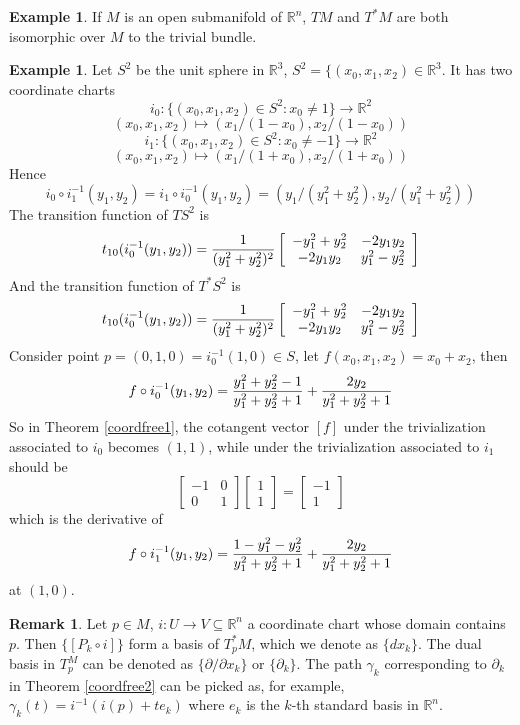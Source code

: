 \documentclass{article}
\theoremstyle{definition}
\newtheorem{rmk}[thm]{Remark}
\newtheorem{exm}[thm]{Example}
\begin{document}
\begin{exm}
    If $M$ is an open submanifold of $\mathbb{R}^n$, $TM$ and $T^*M$ are both isomorphic over $M$ to the trivial bundle.
\end{exm}

\begin{exm}\label{s2}
    Let $S^2$ be the unit sphere in $\mathbb{R}^3$, $S^2=\{(x_0, x_1, x_2)\in\mathbb{R}^3$. It has two coordinate charts 
    \[i_0: \{(x_0, x_1, x_2)\in S^2: x_0\not=1\}\rightarrow \mathbb{R}^2\] 
    \[(x_0, x_1, x_2)\mapsto (x_1/(1-x_0), x_2/(1-x_0))\]
    \[i_1: \{(x_0, x_1, x_2)\in S^2: x_0\not=-1\}\rightarrow \mathbb{R}^2\] 
    \[(x_0, x_1, x_2)\mapsto (x_1/(1+x_0), x_2/(1+x_0))\]
    Hence 
    \[i_0\circ i_1^{-1}(y_1, y_2)=i_1\circ i_0^{-1}(y_1, y_2)=(y_1/(y_1^2+y_2^2), y_2/(y_1^2+y_2^2))\]
    The transition function of $TS^2$ is
    \[t_{10}(i_0^{-1}(y_1, y_2))={1\over (y_1^2+y_2^2)^2}\left[\begin{array}{cc}-y_1^2+y_2^2 & -2y_1y_2\\ -2y_1y_2 & y_1^2-y_2^2\end{array}\right]\]
    And the transition function of $T^*S^2$ is
    \[t_{10}(i_0^{-1}(y_1, y_2))={1\over (y_1^2+y_2^2)^2}\left[\begin{array}{cc}-y_1^2+y_2^2 & -2y_1y_2\\ -2y_1y_2 & y_1^2-y_2^2\end{array}\right]\]
    Consider point $p=(0, 1, 0)=i_0^{-1}(1, 0)\in S$, let $f(x_0, x_1, x_2)=x_0+x_2$, then 
    \[f\circ i_0^{-1}(y_1, y_2)={y_1^2+y_2^2-1\over y_1^2+y_2^2+1}+{2y_2\over y_1^2+y_2^2+1}\]
    So in Theorem \ref{coordfree1}, the cotangent vector $[f]$ under the trivialization associated to $i_0$ becomes $(1, 1)$, while under the trivialization associated to $i_1$ should be 
    \[\left[\begin{array}{cc}-1 & 0 \\ 0 & 1\end{array}\right]\left[\begin{array}{c}1\\1\end{array}\right]=\left[\begin{array}{c}-1\\1\end{array}\right]\]
    which is the derivative of 
    \[f\circ i_1^{-1}(y_1, y_2)={1-y_1^2-y_2^2\over y_1^2+y_2^2+1}+{2y_2\over y_1^2+y_2^2+1}\]
    at $(1, 0)$.
\end{exm}

\begin{rmk}
    Let $p\in M$, $i: U\rightarrow V\subseteq\mathbb{R}^n$ a coordinate chart whose domain contains $p$. Then $\{[P_k\circ i]\}$ form a basis of $T^*_pM$, which we denote as $\{dx_k\}$. The dual basis in $T_p^M$ can be denoted as $\{\partial/\partial x_k\}$ or $\{\partial_k\}$. The path $\gamma_k$ corresponding to $\partial_k$ in Theorem \ref{coordfree2} can be picked as, for example, $\gamma_k(t)=i^{-1}(i(p)+te_k)$ where $e_k$ is the $k$-th standard basis in $\mathbb{R}^n$.
\end{rmk}
\end{document}
